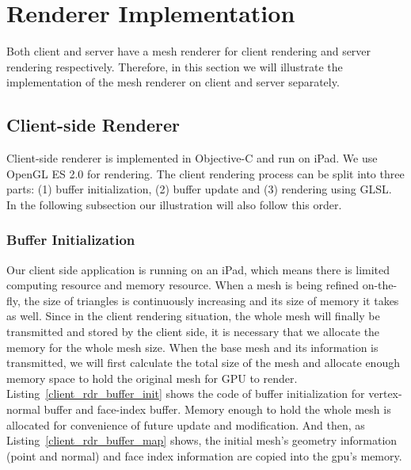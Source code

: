 \section{Renderer Implementation}
\label{section:rendererimpl}
Both client and server have a mesh renderer for client rendering and server rendering respectively. Therefore, in this section we will illustrate the implementation of the mesh renderer on client and server separately. 

\subsection{Client-side Renderer}
\label{section:clientrenderer}
Client-side renderer is implemented in Objective-C and run on iPad. We use OpenGL ES 2.0 for rendering. The client rendering process can be split into three parts: (1) buffer initialization, (2) buffer update and (3) rendering using GLSL. In the following subsection our illustration will also follow this order. 
\subsubsection{Buffer Initialization}
\label{section:bufferinit}
Our client side application is running on an iPad, which means there is limited computing resource and memory resource. When a mesh is being refined on-the-fly, the size of triangles is continuously increasing and its size of memory it takes as well. Since in the client rendering situation, the whole mesh will finally be transmitted and stored by the client side, it is necessary that we allocate the memory for the whole mesh size. When the base mesh and its information is transmitted, we will first calculate the total size of the mesh and allocate enough memory space to hold the original mesh for GPU to render. Listing~\ref{client_rdr_buffer_init} shows the code of buffer initialization for vertex-normal buffer and face-index buffer. Memory enough to hold the whole mesh is allocated for convenience of future update and modification. And then, as Listing~\ref{client_rdr_buffer_map} shows, the initial mesh's geometry information (point and normal) and face index information are copied into the gpu's memory. 



